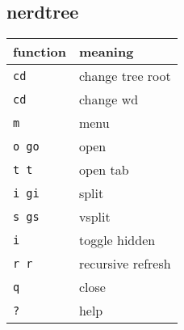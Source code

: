 \subsection*{nerdtree}
\begin{tabular}{l l}
  \toprule
  function      & meaning           \\
  \midrule
  \texttt{cd}   & change tree root  \\
  \texttt{cd}   & change wd         \\
  \texttt{m}    & menu              \\
  \texttt{o go} & open              \\
  \texttt{t t}  & open tab          \\
  \texttt{i gi} & split             \\
  \texttt{s gs} & vsplit            \\
  \texttt{i}    & toggle hidden     \\
  \texttt{r r}  & recursive refresh \\
  \texttt{q}    & close             \\
  \texttt{?}    & help              \\
  \bottomrule
\end{tabular}

